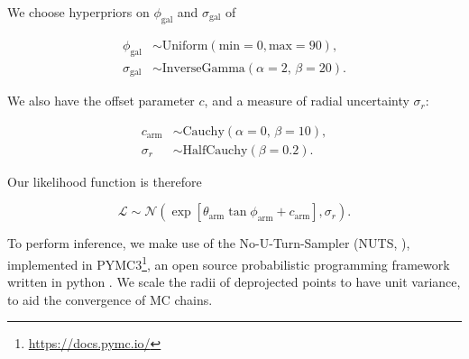 We choose hyperpriors on $\phi_\mathrm{gal}$ and $\sigma_\mathrm{gal}$ of

\begin{align}
  \phi_\mathrm{gal} &\sim \mathrm{Uniform}(\mathrm{min}=0, \mathrm{max}=90),\\
  \sigma_\mathrm{gal} &\sim \mathrm{InverseGamma}(\alpha=2,\,\beta=20).
\end{align}

We also have the offset parameter $c$, and a measure of radial uncertainty $\sigma_r$:

\begin{align}
  c_\mathrm{arm} &\sim \mathrm{Cauchy}(\alpha=0,\,\beta=10),\\
  \sigma_r &\sim \mathrm{HalfCauchy}(\beta=0.2).
\end{align}


Our likelihood function is therefore

\begin{equation}
\mathcal{L} \sim \mathcal{N}\left(\exp\left[\theta_\mathrm{arm}\tan\phi_\mathrm{arm} + c_\mathrm{arm}\right], \sigma_r\right).
\end{equation}


To perform inference, we make use of the No-U-Turn-Sampler (NUTS, \citealt{2011arXiv1111.4246H}), implemented in PYMC3\footnote{\url{https://docs.pymc.io/}}, an open source probabilistic programming framework written in python \citep{pymc3_paper}. We scale the radii of deprojected points to have unit variance, to aid the convergence of MC chains.
